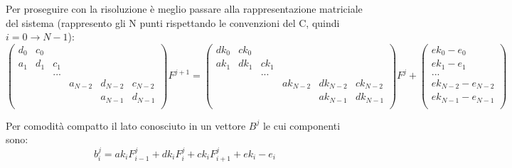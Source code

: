 \documentclass[]{article}
\newcommand{\lr}[3]{\ensuremath{\left#1 #3 \right#2}}
\newcommand{\lrt}[1]{\lr{(}{)}{#1}}
\numberwithin{equation}{subsection}
\begin{document}
Per proseguire con la risoluzione \`e meglio passare alla rappresentazione matriciale del sistema (rappresento gli N punti rispettando le convenzioni del C, quindi $i=0\to N-1$):
\begin{equation}
\lrt{\begin{array}{cccccc}
d_0&c_0&&&\\
a_1&d_1&c_1&\\
&&...&&&\\
&&&a_{N-2}&d_{N-2}&c_{N-2}\\
&&&&a_{N-1}&d_{N-1}\\
\end{array}} F^{j+1} = 
\lrt{\begin{array}{cccccc}
dk_0&ck_0&&&&\\
ak_1&dk_1&ck_1&&&\\
&&...&&&\\
&&&ak_{N-2}&dk_{N-2}&ck_{N-2}\\
&&&&ak_{N-1}&dk_{N-1}\\
\end{array}} F^{j} + 
\lrt{\begin{array}{c}
ek_0 - e_0\\
ek_1 - e_1\\
...\\
ek_{N-2} - e_{N-2}\\
ek_{N-1} - e_{N-1}\\
\end{array}}
\end{equation}

Per comodit\`a compatto il lato conosciuto in un vettore $B^j$ le cui componenti sono:
\begin{equation}\label{eq:bi}
b_i^j = ak_i F_{i-1}^{j}+ dk_i F_{i}^{j} + ck_i F_{i+1}^{j} + ek_i-e_i
\end{equation}
\end{document}
